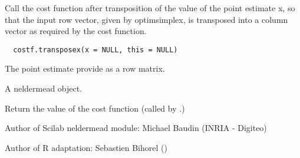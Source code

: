 %
\begin{Description}\relax
Call the cost function after transposition of the value of the point
estimate x, so that the input row vector, given by optimsimplex, is
transposed into a  column vector as required by the cost function.
\end{Description}
%
\begin{Usage}
\begin{verbatim}
  costf.transposex(x = NULL, this = NULL)
\end{verbatim}
\end{Usage}
%
\begin{Arguments}
\begin{ldescription}
\item[\code{x}] The point estimate provide as a row matrix.
\item[\code{this}] A neldermead object.
\end{ldescription}
\end{Arguments}
%
\begin{Value}
Return the value of the cost function (called by .)
\end{Value}
%
\begin{Author}\relax
Author of Scilab neldermead module: Michael Baudin (INRIA - Digiteo)

Author of R adaptation: Sebastien Bihorel ()
\end{Author}
%
\begin{SeeAlso}\relax
{}
\end{SeeAlso}
